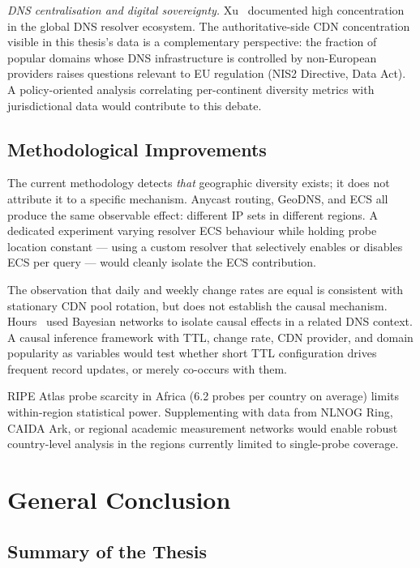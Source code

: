 \textit{\ac{DNS} centralisation and digital sovereignty.}
Xu~\cite{Xu2023} documented high concentration in the global \ac{DNS} resolver ecosystem. The authoritative-side \ac{CDN} concentration visible in this thesis's data is a complementary perspective: the fraction of popular domains whose \ac{DNS} infrastructure is controlled by non-European providers raises questions relevant to EU regulation (NIS2 Directive, Data Act). A policy-oriented analysis correlating per-continent diversity metrics with jurisdictional data would contribute to this debate.

\bigskip
\subsection{Methodological Improvements}
\label{subsec:5.4.3}

The current methodology detects \emph{that} geographic diversity exists; it does not attribute it to a specific mechanism. Anycast routing, GeoDNS, and \ac{ECS} all produce the same observable effect: different \ac{IP} sets in different regions. A dedicated experiment varying resolver \ac{ECS} behaviour while holding probe location constant --- using a custom resolver that selectively enables or disables \ac{ECS} per query --- would cleanly isolate the \ac{ECS} contribution.

The observation that daily and weekly change rates are equal is consistent with stationary \ac{CDN} pool rotation, but does not establish the causal mechanism. Hours~\cite{Hours2016} used Bayesian networks to isolate causal effects in a related \ac{DNS} context. A causal inference framework with \ac{TTL}, change rate, \ac{CDN} provider, and domain popularity as variables would test whether short \ac{TTL} configuration drives frequent record updates, or merely co-occurs with them.

RIPE Atlas probe scarcity in Africa (6.2 probes per country on average) limits within-region statistical power. Supplementing with data from NLNOG Ring, CAIDA Ark, or regional academic measurement networks would enable robust country-level analysis in the regions currently limited to single-probe coverage.

\bigskip
\section{General Conclusion}
\label{sec:5.5}

\subsection{Summary of the Thesis}
\label{subsec:5.5.1}

